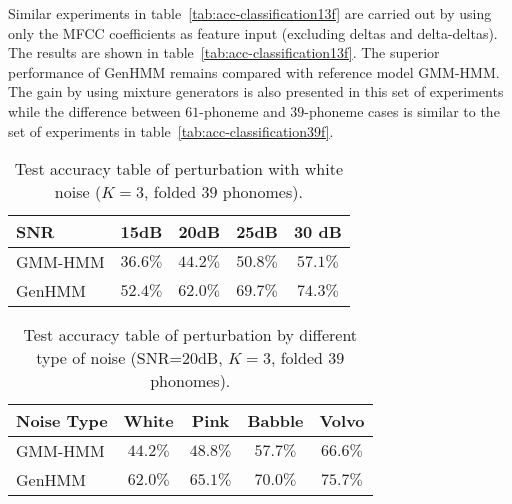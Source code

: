 \documentclass[letterpaper]{article} %
\begin{document}
Similar experiments in table~\ref{tab:acc-classification13f} are carried out by using only the MFCC coefficients as feature input (excluding deltas and delta-deltas). The results are shown in table~\ref{tab:acc-classification13f}. The superior performance of GenHMM remains compared with reference model GMM-HMM. The gain by using mixture generators is also presented in this set of experiments while the difference between $61$-phoneme and $39$-phoneme cases is similar to the set of experiments in table~\ref{tab:acc-classification39f}.

\begin{table}
  \caption{Test accuracy table of perturbation with white noise ($K=3$, folded $39$ phonomes).}
  \label{tab:acc-classification39f_noise_snr}
  \vspace{-0.1cm}
  \centering
  \begin{tabular}{l|c|c|c|c}
    \toprule
    {SNR} &  15dB &  20dB &  25dB & 30 dB  \\  \midrule
    GMM-HMM & $36.6\%$ &  $44.2\%$ &  $50.8\%$ & $57.1\%$  \\ \midrule
    GenHMM & $52.4\%$ & $62.0\%$ &  $69.7\%$ & $74.3\%$ \\ 
    \bottomrule                                                                  
  \end{tabular}
  \vspace{0.1cm}
\end{table}
\begin{table}
  \caption{Test accuracy table of perturbation by different type of noise (SNR=$20$dB, $K=3$, folded $39$ phonomes).}
  \label{tab:acc-classification39f_noise_type}
  \vspace{-0.1cm}
  \centering
  \begin{tabular}{l|c|c|c|c}
    \toprule
    {Noise Type} &  White &  Pink &  Babble & Volvo  \\  \midrule
    GMM-HMM & $44.2\%$ &  $48.8\%$ &  $57.7\%$ & $66.6\%$  \\ \midrule
    GenHMM & $62.0\%$ & $65.1\%$ &  $70.0\%$ & $75.7\%$ \\ 
    \bottomrule                                                                  
  \end{tabular}
  \vspace{0.3cm}
\end{table}
\end{document}
